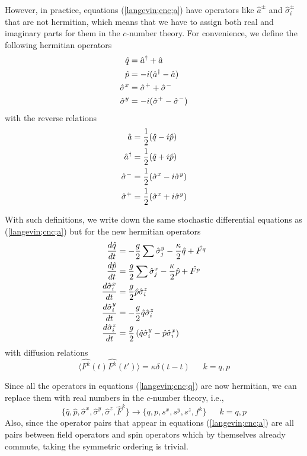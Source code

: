 \documentclass{article}
\begin{document}
However, in practice, equations (\ref{langevin;cnc;a}) have operators like $\hat{a}^{\pm}$ and $\hat{\sigma}_i^\pm$ that are not hermitian, which means that we have to assign both real and imaginary parts for them in the $c$-number theory. For convenience, we define the following hermitian operators
\begin{align}
    \notag \hat{q} &= \hat{a}^\dagger+\hat{a}\\
    \notag \hat{p} &= -i(\hat{a}^\dagger-\hat{a})\\
           \hat{\sigma}^x &= \hat{\sigma}^++\hat{\sigma}^-\\
    \notag \hat{\sigma}^y &= -i(\hat{\sigma}^+-\hat{\sigma}^-)
\end{align}
with the reverse relations
\begin{align}
    \notag \hat{a} &= \frac{1}{2}(\hat{q}-i\hat{p})\\
    \notag \hat{a}^\dagger &= \frac{1}{2}(\hat{q}+i\hat{p})\\
           \hat{\sigma}^- &= \frac{1}{2}(\hat{\sigma}^x-i\hat{\sigma}^y)\\
    \notag \hat{\sigma}^+ &= \frac{1}{2}(\hat{\sigma}^x+i\hat{\sigma}^y)
\end{align}

With such definitions, we write down the same stochastic differential equations as (\ref{langevin;cnc;a}) but for the new hermitian operators
\begin{align}
    \notag \frac{d \hat{q}}{dt} &= -\frac{g}{2}\sum\hat{\sigma}_j^y-\frac{\kappa}{2}\hat{q}+\hat{F^q}\\
    \notag \frac{d \hat{p}}{dt} &= \frac{g}{2}\sum\hat{\sigma}_j^x-\frac{\kappa}{2}\hat{p}+\hat{F^p}\\
    \label{langevin;cnc;q}
    \frac{d \hat{\sigma}_i^x}{dt} &= \frac{g}{2}\hat{p}\hat{\sigma}^z_i\\
    \notag \frac{d \hat{\sigma}_i^y}{dt} &= -\frac{g}{2}\hat{q}\hat{\sigma}^z_i\\
    \notag \frac{d \hat{\sigma}_i^z}{dt} &= \frac{g}{2}\left(\hat{q}\hat{\sigma}^y_i-\hat{p}\hat{\sigma}_i^x\right)
\end{align}
with diffusion relations
\begin{equation}
\label{diffusion;cnc;q}
    \langle \hat{F^k}(t) \hat{F^k}(t')\rangle = \kappa \delta (t-t)\ \ \ \ \ \ \  k=q,p
\end{equation}

Since all the operators in equations (\ref{langevin;cnc;q}) are now hermitian, we can replace them with real numbers in the $c$-number theory, i.e., 
\begin{equation}
    \{ \hat{q}, \hat{p}, \hat{\sigma}^x, \hat{\sigma}^y, \hat{\sigma}^z, \hat{F}^k\} \longrightarrow \{q, p, s^x, s^y, s^z, f^k\}\ \ \ \ \ \ \  k=q,p
\end{equation}
Also, since the operator pairs that appear in equations (\ref{langevin;cnc;a}) are all pairs between field operators and spin operators which by themselves already commute, taking the symmetric ordering is trivial.
\end{document}
